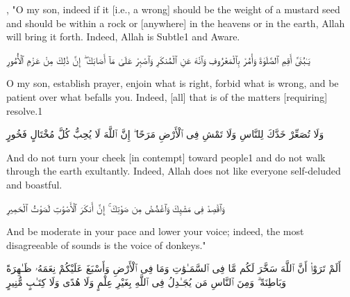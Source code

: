 \begin{translation}
	, "O my son, indeed if it [i.e., a wrong] should be the weight of a mustard seed and should be within a rock or [anywhere] in the heavens or in the earth, Allah will bring it forth. Indeed, Allah is Subtle1 and Aware.
\end{translation}


\begin{edition*}
	\begin{Arabic}
		يَـٰبُنَىَّ أَقِمِ ٱلصَّلَوٰةَ وَأْمُرْ بِٱلْمَعْرُوفِ وَٱنْهَ عَنِ ٱلْمُنكَرِ وَٱصْبِرْ عَلَىٰ مَآ أَصَابَكَ ۖ إِنَّ ذَٰلِكَ مِنْ عَزْمِ ٱلْأُمُورِ
	\end{Arabic}
\end{edition*}

\begin{translation}
	O my son, establish prayer, enjoin what is right, forbid what is wrong, and be patient over what befalls you. Indeed, [all] that is of the matters [requiring] resolve.1
\end{translation}


\begin{edition*}
	\begin{Arabic}
		وَلَا تُصَعِّرْ خَدَّكَ لِلنَّاسِ وَلَا تَمْشِ فِى ٱلْأَرْضِ مَرَحًا ۖ إِنَّ ٱللَّهَ لَا يُحِبُّ كُلَّ مُخْتَالٍ فَخُورٍ
	\end{Arabic}
\end{edition*}

\begin{translation}
	And do not turn your cheek [in contempt] toward people1 and do not walk through the earth exultantly. Indeed, Allah does not like everyone self-deluded and boastful.
\end{translation}


\begin{edition*}
	\begin{Arabic}
		وَٱقْصِدْ فِى مَشْيِكَ وَٱغْضُضْ مِن صَوْتِكَ ۚ إِنَّ أَنكَرَ ٱلْأَصْوَٰتِ لَصَوْتُ ٱلْحَمِيرِ
	\end{Arabic}
\end{edition*}

\begin{translation}
	And be moderate in your pace and lower your voice; indeed, the most disagreeable of sounds is the voice of donkeys."
\end{translation}


\begin{edition*}
	\begin{Arabic}
		أَلَمْ تَرَوْا۟ أَنَّ ٱللَّهَ سَخَّرَ لَكُم مَّا فِى ٱلسَّمَـٰوَٰتِ وَمَا فِى ٱلْأَرْضِ وَأَسْبَغَ عَلَيْكُمْ نِعَمَهُۥ ظَـٰهِرَةً وَبَاطِنَةً ۗ وَمِنَ ٱلنَّاسِ مَن يُجَـٰدِلُ فِى ٱللَّهِ بِغَيْرِ عِلْمٍ وَلَا هُدًى وَلَا كِتَـٰبٍ مُّنِيرٍ
	\end{Arabic}
\end{edition*}

